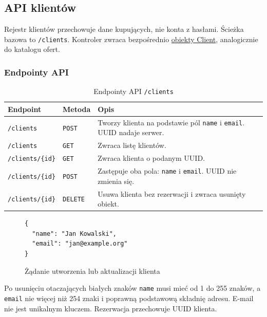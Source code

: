 \subsection{API klientów}

Rejestr klientów przechowuje dane kupujących, nie konta z hasłami.
Ścieżka bazowa to \texttt{/clients}. Kontroler zwraca bezpośrednio
\hyperref[schema:client]{obiekty Client}, analogicznie do katalogu ofert.

\subsubsection{Endpointy API}

\begin{table}[H]
  \centering
  \renewcommand{\arraystretch}{1.3}
  \begin{tabularx}{\textwidth}{|l|l|X|}
    \hline
    \textbf{Endpoint} & \textbf{Metoda} & \textbf{Opis} \\
    \hline
    \texttt{/clients} & \texttt{POST} & Tworzy klienta na podstawie pól \texttt{name} i \texttt{email}. UUID nadaje serwer. \\
    \hline
    \texttt{/clients} & \texttt{GET} & Zwraca listę klientów. \\
    \hline
    \texttt{/clients/\{id\}} & \texttt{GET} & Zwraca klienta o podanym UUID. \\
    \hline
    \texttt{/clients/\{id\}} & \texttt{POST} & Zastępuje oba pola: \texttt{name} i \texttt{email}. UUID nie zmienia się. \\
    \hline
    \texttt{/clients/\{id\}} & \texttt{DELETE} & Usuwa klienta bez rezerwacji i zwraca usunięty obiekt. \\
    \hline
  \end{tabularx}
  \caption{Endpointy API \texttt{/clients}}
  \label{tab:client-endpoints}
\end{table}

\begin{figure}[H]
\begin{verbatim}
{
  "name": "Jan Kowalski",
  "email": "jan@example.org"
}
\end{verbatim}
\caption{Żądanie utworzenia lub aktualizacji klienta}
\label{schema:client-request}
\end{figure}

Po usunięciu otaczających białych znaków \texttt{name} musi mieć od 1 do 255 znaków,
a \texttt{email} nie więcej niż 254 znaki i poprawną podstawową składnię adresu.
E-mail nie jest unikalnym kluczem.
Rezerwacja przechowuje UUID klienta.

